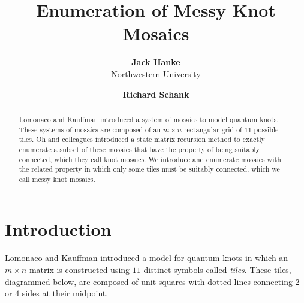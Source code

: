 \documentclass[12pt]{article}
\date{}
\author{
    \textbf{Jack Hanke}\\
    Northwestern University
    \and
    \textbf{Richard Schank}\\
    }
\title{\textbf{Enumeration of Messy Knot Mosaics}}
\theoremstyle{plain}
\theoremstyle{definition}
\theoremstyle{remark}
\theoremstyle{definition}
\newcommand{\cell}[4]{ \draw[thick] ( #1 , #2 ) rectangle ( #3 , #4 );}
\newcommand{\cellA}[4]{\draw[red, thick, densely dotted] ( #1 + 0.5 , #2 ) arc(0:90:{0.5}); \draw[thick] ( #1 , #2 ) rectangle ( #3 , #4 );}
\newcommand{\cellB}[4]{\draw[red, thick, densely dotted] ( #1 + 1 , #2 + 0.5 ) arc(90:180:{0.5}); \draw[thick] ( #1 , #2 ) rectangle ( #3 , #4 );}
\newcommand{\cellC}[4]{\draw[red, thick, densely dotted] ( #1 + 0.5, #2 + 1 ) arc(180:270:{0.5}); \draw[thick] ( #1 , #2 ) rectangle ( #3 , #4 );}
\newcommand{\cellD}[4]{\draw[red, thick, densely dotted] ( #1 , #2 + 0.5 ) arc(-90:0:{0.5}); \draw[thick] ( #1 , #2 ) rectangle ( #3 , #4 );}
\newcommand{\cellE}[4]{\draw[red, thick, densely dotted] (#3, #4 * 0.5 + #2 * 0.5) -- (#1, #4 * 0.5 + #2 * 0.5); \draw[thick] ( #1 , #2 ) rectangle ( #3 , #4 );}
\newcommand{\cellF}[4]{\draw[red, thick, densely dotted] (#3 * 0.5 + #1 * 0.5 , #2) -- (#3 * 0.5 + #1 * 0.5 , #4); \draw[thick] ( #1 , #2 ) rectangle ( #3 , #4 );}
\newcommand{\cellG}[4]{\draw[red, thick, densely dotted] ( #1 + 0.5 , #2 ) arc(0:90:{0.5}); \draw[red, thick, densely dotted] ( #1 + 0.5, #2 + 1 ) arc(180:270:{0.5}); \draw[thick] ( #1 , #2 ) rectangle ( #3 , #4 );}
\newcommand{\cellH}[4]{\draw[red, thick, densely dotted] ( #1 , #2 + 0.5 ) arc(-90:0:{0.5}); \draw[red, thick, densely dotted] ( #1 + 1 , #2 + 0.5 ) arc(90:180:{0.5}); \draw[thick] ( #1 , #2 ) rectangle ( #3 , #4 );}
\newcommand{\cellI}[4]{\draw[red, thick, densely dotted] (#3 * 0.5 + #1 * 0.5 , #2) -- (#3 * 0.5 + #1 * 0.5 , #4); \node[shape=circle,draw=none,fill=white, inner sep=3pt,minimum size=5pt] (A) at ( #1 + 0.5 , #2 + 0.5 ) {}; \draw[red, thick, densely dotted] (#3, #4 * 0.5 + #2 * 0.5) -- (#1, #4 * 0.5 + #2 * 0.5); \draw[thick] ( #1 , #2 ) rectangle ( #3 , #4 );}
\newcommand{\cellJ}[4]{\draw[red, thick, densely dotted] (#3, #4 * 0.5 + #2 * 0.5) -- (#1, #4 * 0.5 + #2 * 0.5); \node[shape=circle,draw=none,fill=white, inner sep=3pt,minimum size=5pt] (A) at ( #1 + 0.5 , #2 + 0.5 ) {}; \draw[thick] ( #1 , #2 ) rectangle ( #3 , #4 ); \draw[red, thick, densely dotted] (#3 * 0.5 + #1 * 0.5 , #2) -- (#3 * 0.5 + #1 * 0.5 , #4);}
\newcommand{\lablnode}[3]{\node[shape=circle,draw=none,fill=none, inner sep=0pt,minimum size=0pt] (A) at ( #1 , #2 ) {#3};}
\begin{document}
\maketitle

\begin{center}

    \begin{abstract}
        Lomonaco and Kauffman introduced a system of mosaics to model quantum knots. These systems of mosaics are composed of an $m \times n$ rectangular grid of $11$ possible tiles. Oh and colleagues introduced a state matrix recursion method to exactly enumerate a subset of these mosaics that have the property of being suitably connected, which they call knot mosaics. We introduce and enumerate mosaics with the related property in which only some tiles must be suitably connected, which we call messy knot mosaics.
    \end{abstract}

\end{center}

\section{Introduction}

Lomonaco and Kauffman \cite{Lomonaco08} introduced a model for quantum knots in which an $m \times n$ matrix is constructed using $11$ distinct symbols called \textit{tiles}. These tiles, diagrammed below, are composed of unit squares with dotted lines connecting $2$ or $4$ sides at their midpoint.

\begin{center}
\end{center}
\end{document}
